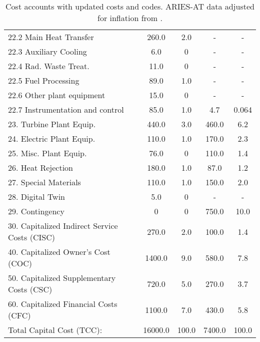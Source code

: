 \begin{table}[h!]
{\begin{tabular}{lcccc}
\hspace{10mm}22.2 Main Heat Transfer & 260.0 & 2.0 & - & - \\
\hspace{10mm}22.3 Auxiliary Cooling & 6.0 & 0 & - & - \\
\hspace{10mm}22.4 Rad. Waste Treat. & 11.0 & 0 & - & - \\
\hspace{10mm}22.5 Fuel Processing & 89.0 & 1.0 & - & - \\
\hspace{10mm}22.6 Other plant equipment & 15.0 & 0 & - & - \\
\hspace{10mm}22.7 Instrumentation and control & 85.0 & 1.0 & 4.7 & 0.064 \\
\hspace{5mm}23. Turbine Plant Equip. & 440.0 & 3.0 & 460.0 & 6.2 \\
\hspace{5mm}24. Electric Plant Equip. & 110.0 & 1.0 & 170.0 & 2.3 \\
\hspace{5mm}25. Misc. Plant Equip. & 76.0 & 0 & 110.0 & 1.4 \\
\hspace{5mm}26. Heat Rejection & 180.0 & 1.0 & 87.0 & 1.2 \\
\hspace{5mm}27. Special Materials & 110.0 & 1.0 & 150.0 & 2.0 \\
\hspace{5mm}28. Digital Twin & 5.0 & 0 & - & - \\
\hspace{5mm}29. Contingency & 0 & 0 & 750.0 & 10.0 \\
30. Capitalized Indirect Service Costs (CISC) & 270.0 & 2.0 & 100.0 & 1.4 \\
40. Capitalized Owner’s Cost (COC) & 1400.0 & 9.0 & 580.0 & 7.8 \\
50. Capitalized Supplementary Costs (CSC) & 720.0 & 5.0 & 270.0 & 3.7 \\
60. Capitalized Financial Costs (CFC) & 1100.0 & 7.0 & 430.0 & 5.8 \\
\hline
Total Capital Cost (TCC): & 16000.0 & 100.0 & 7400.0 & 100.0 \\
\hline
\end{tabular}
}
\caption{Cost accounts with updated costs and codes. ARIES-AT data adjusted for inflation from \cite{gordon1986mirror}.}
\label{tab:costs_updated_codes}
\end{table}


